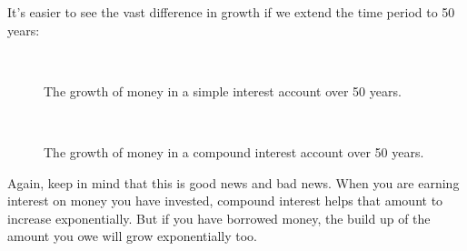 It’s easier to see the vast difference in growth if we extend the time period to 50 years:
\begin{figure}[H]
    \begin{center}
\\
	\begin{caption*}The growth of money in a simple interest account over 50 years.\end{caption*}
	\label{FG:fig:SI10}
    \end{center}
\end{figure}

\begin{figure}[H]
    \begin{center}
\\
	\begin{caption*}The growth of money in a compound interest account over 50 years.\end{caption*}
	\label{FG:fig:CI10}
    \end{center}
\end{figure}

Again, keep in mind that this is good news and bad news. When you are earning interest on money you have invested, compound interest helps that amount to increase exponentially. But if you have borrowed money, the build up of the amount you owe will grow exponentially too.


